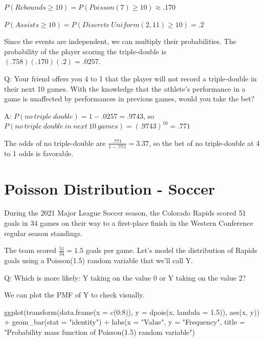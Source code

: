 \documentclass[
  11pt,
]{book}
\newenvironment{Shaded}{\begin{snugshade}}{\end{snugshade}}
\newcommand{\AttributeTok}[1]{\textcolor[rgb]{0.77,0.63,0.00}{#1}}
\newcommand{\DecValTok}[1]{\textcolor[rgb]{0.00,0.00,0.81}{#1}}
\newcommand{\FloatTok}[1]{\textcolor[rgb]{0.00,0.00,0.81}{#1}}
\newcommand{\FunctionTok}[1]{\textcolor[rgb]{0.00,0.00,0.00}{#1}}
\newcommand{\NormalTok}[1]{#1}
\newcommand{\SpecialCharTok}[1]{\textcolor[rgb]{0.00,0.00,0.00}{#1}}
\newcommand{\StringTok}[1]{\textcolor[rgb]{0.31,0.60,0.02}{#1}}
\theoremstyle{definition}
\theoremstyle{definition}
\theoremstyle{definition}
\theoremstyle{definition}
\theoremstyle{remark}
\begin{document}
\(P(Rebounds \geq 10) = P(Poisson(7) \geq 10) \approx .170\)

\(P(Assists \geq 10) = P(Discrete\ Uniform(2, 11) \geq 10) = .2\)

Since the events are independent, we can multiply their probabilities. The probability of the player scoring the triple-double is \((.758)(.170)(.2) = .0257\).

Q: Your friend offers you 4 to 1 that the player will not record a triple-double in their next 10 games. With the knowledge that the athlete's performance in a game is unaffected by performances in previous games, would you take the bet?

A: \(P(no\ triple\ double) = 1 - .0257 = .9743\), so \(P(no\ triple\ double\ in\ next\ 10\ games) = (.9743)^{10} = .771\)

The odds of no triple-double are \(\frac{.771}{1-.771} = 3.37\), so the bet of no triple-double at 4 to 1 odds is favorable.

\hypertarget{poisson-distribution---soccer}{%
\section{Poisson Distribution - Soccer}\label{poisson-distribution---soccer}}

During the 2021 Major League Soccer season, the Colorado Rapids scored 51 goals in 34 games on their way to a first-place finish in the Western Conference regular season standings.

The team scored \(\frac{51}{34} = 1.5\) goals per game. Let's model the distribution of Rapids goals using a Poisson(1.5) random variable that we'll call Y.

Q: Which is more likely: Y taking on the value 0 or Y taking on the value 2?

We can plot the PMF of Y to check visually.

\begin{Shaded}
\begin{Highlighting}[]
\FunctionTok{ggplot}\NormalTok{(}\FunctionTok{transform}\NormalTok{(}\FunctionTok{data.frame}\NormalTok{(}\AttributeTok{x =} \FunctionTok{c}\NormalTok{(}\DecValTok{0}\SpecialCharTok{:}\DecValTok{8}\NormalTok{)), }\AttributeTok{y =} \FunctionTok{dpois}\NormalTok{(x, }\AttributeTok{lambda =} \FloatTok{1.5}\NormalTok{)), }\FunctionTok{aes}\NormalTok{(x, y)) }\SpecialCharTok{+}
    \FunctionTok{geom\_bar}\NormalTok{(}\AttributeTok{stat =} \StringTok{"identity"}\NormalTok{) }\SpecialCharTok{+} \FunctionTok{labs}\NormalTok{(}\AttributeTok{x =} \StringTok{"Value"}\NormalTok{, }\AttributeTok{y =} \StringTok{"Frequency"}\NormalTok{, }\AttributeTok{title =} \StringTok{"Probability mass function of Poisson(1.5) random variable"}\NormalTok{)}
\end{Highlighting}
\end{Shaded}
\end{document}
